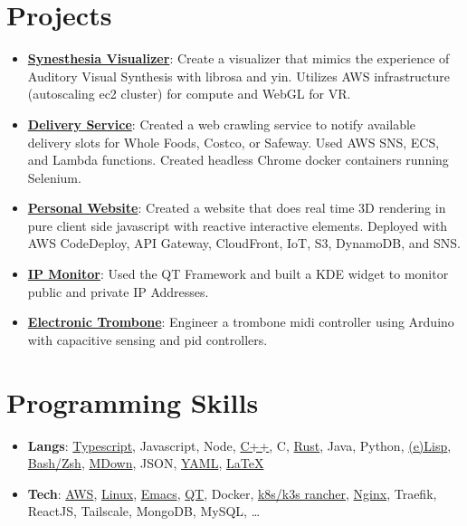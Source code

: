 \documentclass[letterpaper,11pt]{article}
\newcommand{\resumeItem}[2]{
	\item[]\small{
		\textbf{#1}{: #2 \vspace{-2pt}}
	}
}
\newcommand{\resumeSubHeadingListStart}{\begin{itemize}[leftmargin=1mm]}
\newcommand{\resumeSubHeadingListEnd}{\end{itemize}}
\begin{document}
\section{Projects}
\resumeSubHeadingListStart
\resumeItem{\href{https://github.com/sachiniyer/SynesthesiaVisualizer}{Synesthesia Visualizer}}
{Create a visualizer that mimics the experience of Auditory Visual Synthesis with librosa and yin. Utilizes AWS infrastructure (autoscaling ec2 cluster) for compute and WebGL for VR.}
\resumeItem{\href{https://github.com/sachiniyer/delivery-service}{Delivery Service}}
{Created a web crawling service to notify available delivery slots for Whole Foods, Costco, or Safeway. Used AWS SNS, ECS, and Lambda functions. Created headless Chrome docker containers running Selenium.}
\resumeItem{\href{https://sachiniyer.com}{Personal Website}}
{Created a website that does real time 3D rendering in pure client side javascript with reactive interactive elements. Deployed with AWS CodeDeploy, API Gateway, CloudFront, IoT, S3, DynamoDB, and SNS.}
\resumeItem{\href{https://github.com/sachiniyer/ip-monitor}{IP Monitor}}
{Used the QT Framework and built a KDE widget to monitor public and private IP Addresses.}
\resumeItem{\href{https://github.com/sachiniyer/Electric-Trombone}{Electronic Trombone}}
{Engineer a trombone midi controller using Arduino with capacitive sensing and pid controllers.}
\resumeSubHeadingListEnd

%
\section{Programming Skills}
\resumeSubHeadingListStart{}
\resumeItem{Langs}
{\href{https://dev.hsrn.nyu.edu/corelink/corelink-examples/-/tree/dev/example-browser}{Typescript}, Javascript, Node, \href{https://dev.hsrn.nyu.edu/si2073/audio-cpp/-/tree/main/}{C++}, C, \href{https://github.com/sachiniyer/rustlings-solutions}{Rust}, Java, Python, \href{https://github.com/sachiniyer/emacs/blob/old-config/.emacs}{(e)Lisp}, \href{https://dev.hsrn.nyu.edu/corelink/corelink-client/-/tree/dev/bash}{Bash/Zsh}, \href{https://dev.hsrn.nyu.edu/corelink/corelink-documentation/-/tree/master/docs}{MDown}, JSON, \href{https://github.com/sachiniyer/control_display/blob/main/control_display_site/deployment.yaml}{YAML}, \href{https://github.com/sachiniyer/resume/blob/master/resume.tex}{\LaTeX}} %
\resumeItem{Tech}
{\href{https://www.credly.com/badges/ef46fdf4-2c55-474d-a963-9ee14107160f}{AWS}, \href{https://github.com/sachiniyer/resume/tree/master/environment}{Linux}, \href{https://github.com/sachiniyer/emacs}{Emacs}, \href{https://github.com/sachiniyer/ip-monitor}{QT}, Docker, \href{https://github.com/sachiniyer/cheap_portable_k3s/blob/main/README.pdf}{k8s/k3s rancher}, \href{https://github.com/sachiniyer/cheap_portable_k3s/blob/main/nginx.conf}{Nginx}, Traefik, ReactJS, Tailscale, MongoDB, MySQL, \ldots}
\resumeSubHeadingListEnd{}
\end{document}

